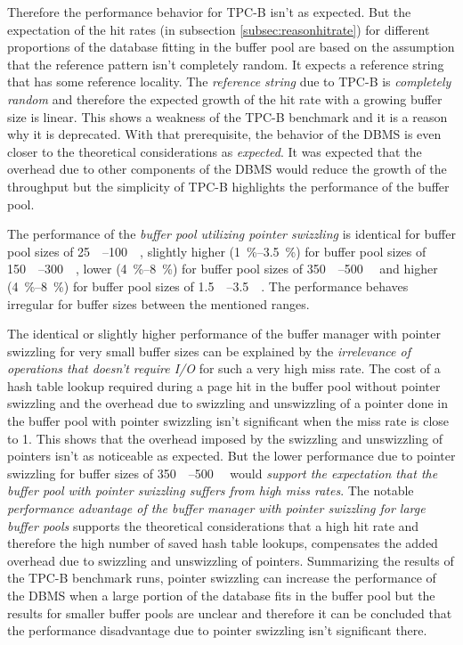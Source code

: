     Therefore the performance behavior for TPC-B isn't as expected. But the expectation of the hit rates (in subsection \ref{subsec:reasonhitrate}) for different proportions of the database fitting in the buffer pool are based on the assumption that the reference pattern isn't completely random. It expects a reference string that has some reference locality. The \emph{reference string} due to TPC-B is \emph{completely random} and therefore the expected growth of the hit rate with a growing buffer size is linear. This shows a weakness of the TPC-B benchmark and it is a reason why it is deprecated. With that prerequisite, the behavior of the DBMS is even closer to the theoretical considerations as \emph{expected}. It was expected that the overhead due to other components of the DBMS would reduce the growth of the throughput but the simplicity of TPC-B highlights the performance of the buffer pool.

    The performance of the \emph{buffer pool utilizing pointer swizzling} is identical for buffer pool sizes of \SIrange{25}{100}{\mebi\byte}, slightly higher (\SIrange{1}{3.5}{\percent}) for buffer pool sizes of \SIrange{150}{300}{\mebi\byte}, lower (\SIrange{4}{8}{\percent}) for buffer pool sizes of \SIrange{350}{500}{\mebi\byte} and higher (\SIrange{4}{8}{\percent}) for buffer pool sizes of \SIrange{1.5}{3.5}{\gibi\byte}. The performance behaves irregular for buffer sizes between the mentioned ranges.

    The identical or slightly higher performance of the buffer manager with pointer swizzling for very small buffer sizes can be explained by the \emph{irrelevance of operations that doesn't require I/O} for such a very high miss rate. The cost of a hash table lookup required during a page hit in the buffer pool without pointer swizzling and the overhead due to swizzling and unswizzling of a pointer done in the buffer pool with pointer swizzling isn't significant when the miss rate is close to 1. This shows that the overhead imposed by the swizzling and unswizzling of pointers isn't as noticeable as expected. But the lower performance due to pointer swizzling for buffer sizes of \SIrange{350}{500}{\mebi\byte} would \emph{support the expectation that the buffer pool with pointer swizzling suffers from high miss rates}. The notable \emph{performance advantage of the buffer manager with pointer swizzling for large buffer pools} supports the theoretical considerations that a high hit rate and therefore the high number of saved hash table lookups, compensates the added overhead due to swizzling and unswizzling of pointers. Summarizing the results of the TPC-B benchmark runs, pointer swizzling can increase the performance of the DBMS when a large portion of the database fits in the buffer pool but the results for smaller buffer pools are unclear and therefore it can be concluded that the performance disadvantage due to pointer swizzling isn't significant there.

